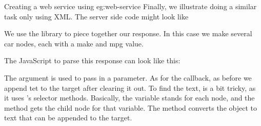 \begin{example}{Creating a web service using }{eg:web-service}
Finally, we illustrate doing a similar task only using XML. The server
side code might look like
\begin{Schunk}
\end{Schunk}
We use the  library to piece together our response. In this
case we make several car nodes, each with a make and mpg value.

The JavaScript to parse this response can look like this:
The  argument is used to pass in a parameter. As for the
 callback, as before we append tet to the target after
clearing it out. To find the text, is a bit tricky, as it uses
's selector methods. Basically, the variable 
stands for each  node, and the  method gets the
child node for that variable. The  method converts the
object to text that can be appended to the target.
\end{example}










